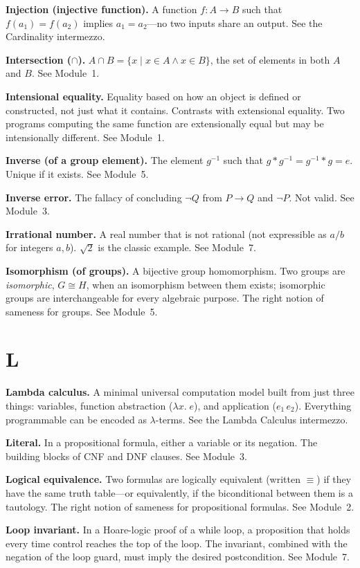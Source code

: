 \documentclass[11pt]{article}
\begin{document}
\textbf{Injection (injective function).} A function $f : A \to B$ such that $f(a_1) = f(a_2)$ implies $a_1 = a_2$---no two inputs share an output. See the Cardinality intermezzo.

\textbf{Intersection ($\cap$).} $A \cap B = \{x \mid x \in A \wedge x \in B\}$, the set of elements in both $A$ and $B$. See Module~1.

\textbf{Intensional equality.} Equality based on how an object is defined or constructed, not just what it contains. Contrasts with extensional equality. Two programs computing the same function are extensionally equal but may be intensionally different. See Module~1.

\textbf{Inverse (of a group element).} The element $g^{-1}$ such that $g * g^{-1} = g^{-1} * g = e$. Unique if it exists. See Module~5.

\textbf{Inverse error.} The fallacy of concluding $\lnot Q$ from $P \to Q$ and $\lnot P$. Not valid. See Module~3.

\textbf{Irrational number.} A real number that is not rational (not expressible as $a/b$ for integers $a, b$). $\sqrt{2}$ is the classic example. See Module~7.

\textbf{Isomorphism (of groups).} A bijective group homomorphism. Two groups are \emph{isomorphic}, $G \cong H$, when an isomorphism between them exists; isomorphic groups are interchangeable for every algebraic purpose. The right notion of sameness for groups. See Module~5.

\section*{L}

\textbf{Lambda calculus.} A minimal universal computation model built from just three things: variables, function abstraction ($\lambda x.\; e$), and application ($e_1\, e_2$). Everything programmable can be encoded as $\lambda$-terms. See the Lambda Calculus intermezzo.

\textbf{Literal.} In a propositional formula, either a variable or its negation. The building blocks of CNF and DNF clauses. See Module~3.

\textbf{Logical equivalence.} Two formulas are logically equivalent (written $\equiv$) if they have the same truth table---or equivalently, if the biconditional between them is a tautology. The right notion of sameness for propositional formulas. See Module~2.

\textbf{Loop invariant.} In a Hoare-logic proof of a while loop, a proposition that holds every time control reaches the top of the loop. The invariant, combined with the negation of the loop guard, must imply the desired postcondition. See Module~7.
\end{document}
